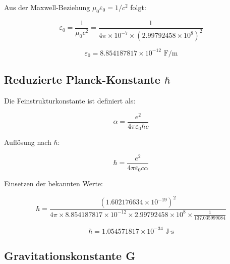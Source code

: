 \documentclass[12pt,a4paper]{article}
\theoremstyle{definition}
\begin{document}
	Aus der Maxwell-Beziehung $\mu_0 \varepsilon_0 = 1/c^2$ folgt:
	
	\begin{equation}
		\varepsilon_0 = \frac{1}{\mu_0 c^2} = \frac{1}{4\pi \times 10^{-7} \times (2.99792458 \times 10^8)^2}
	\end{equation}
	
	\begin{tcolorbox}[colback=green!5!white,colframe=green!75!black,title=Vakuum-Permittivit\"at]
		\begin{equation}
			\boxed{\varepsilon_0 = 8.854187817 \times 10^{-12} \text{ F/m}}
		\end{equation}
	\end{tcolorbox}
	
	\subsection{Reduzierte Planck-Konstante $\hbar$}
	
	Die Feinstrukturkonstante ist definiert als:
	
	\begin{equation}
		\alpha = \frac{e^2}{4\pi\varepsilon_0\hbar c}
	\end{equation}
	
	Aufl\"osung nach $\hbar$:
	
	\begin{equation}
		\hbar = \frac{e^2}{4\pi\varepsilon_0 c \alpha}
	\end{equation}
	
	Einsetzen der bekannten Werte:
	
	\begin{equation}
		\hbar = \frac{(1.602176634 \times 10^{-19})^2}{4\pi \times 8.854187817 \times 10^{-12} \times 2.99792458 \times 10^8 \times \frac{1}{137.035999084}}
	\end{equation}
	
	\begin{tcolorbox}[colback=green!5!white,colframe=green!75!black,title=Reduzierte Planck-Konstante]
		\begin{equation}
			\boxed{\hbar = 1.054571817 \times 10^{-34} \text{ J·s}}
		\end{equation}
	\end{tcolorbox}
	
	\subsection{Gravitationskonstante G}
	
\end{document}
